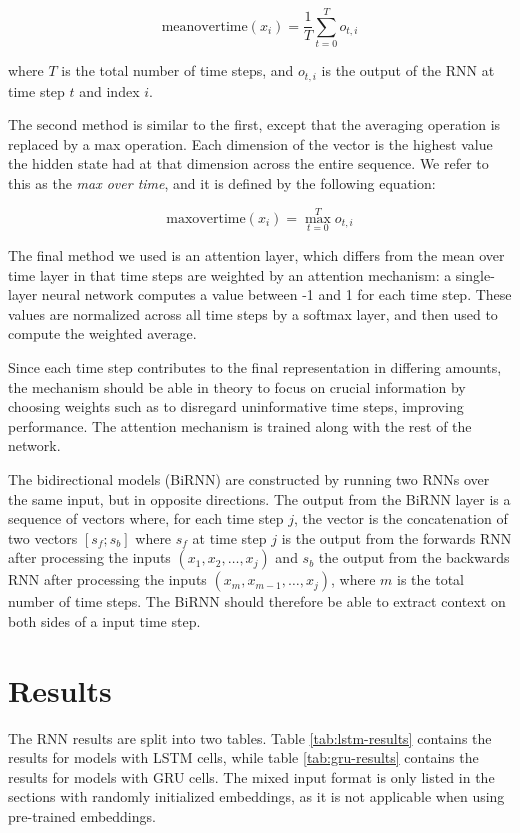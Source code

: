 \[
  \mathrm{meanovertime}(x_i) = \frac{1}{T}\sum_{t=0}^T o_{t,i}
\]

where $T$ is the total number of time steps, and $o_{t,i}$ is the output of
the RNN at time step $t$ and index $i$.

The second method is similar to the first, except that the averaging
operation is replaced by a max operation. Each dimension of the vector is the
highest value the hidden state had at that dimension across the entire
sequence. We refer to this as the \emph{max over time}, and it is defined by
the following equation:

\[
  \mathrm{maxovertime}(x_i) = \max_{t=0}^T o_{t,i}
\]

The final method we used is an attention layer, which differs from the mean
over time layer in that time steps are weighted by an attention mechanism: a
single-layer neural network computes a value between -1 and 1 for each time
step. These values are normalized across all time steps by a softmax layer,
and then used to compute the weighted average.

Since each time step contributes to the final representation in differing
amounts, the mechanism should be able in theory to focus on crucial
information by choosing weights such as to disregard uninformative time
steps, improving performance. The attention mechanism is trained along with
the rest of the network.

The bidirectional models (BiRNN) are constructed by running two \acp{RNN}
over the same input, but in opposite directions. The output from the BiRNN
layer is a sequence of vectors where, for each time step $j$, the vector is
the concatenation of two vectors $[s_f;s_b]$ where $s_f$ at time step $j$ is
the output from the forwards \ac{RNN} after processing the inputs $(x_1, x_2,
\ldots, x_j)$ and $s_b$ the output from the backwards \ac{RNN} after
processing the inputs $(x_m, x_{m-1}, \ldots, x_j)$, where $m$ is the total
number of time steps. The BiRNN should therefore be able to extract context
on both sides of a input time step.


\section{Results}

The RNN results are split into two tables. Table \ref{tab:lstm-results}
contains the results for models with \ac{LSTM} cells, while table
\ref{tab:gru-results} contains the results for models with \ac{GRU} cells.
The mixed input format is only listed in the sections with randomly
initialized embeddings, as it is not applicable when using pre-trained
embeddings.


